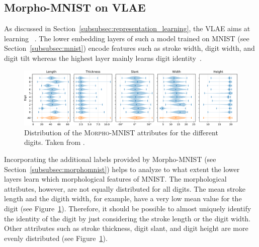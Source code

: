 \subsection{Morpho-MNIST on VLAE}\label{subsec:morpho-mnist-on-vlae}

As discussed in Section~\ref{subsubsec:representation_learning}, the \acl{VLAE} aims at learning ~\citep{zhao2017learning}.
The lower embedding layers of such a model trained on MNIST (see Section~\ref{subsubsec:mnist}) encode features such as stroke width, digit width, and digit tilt whereas the highest layer mainly learns digit identity~\citep{zhao2017learning}.

\begin{figure}
    \centering
    \includegraphics[width=\textwidth]{images/morpho_mnist_distribution.png}
    \caption{Distribution of the \textsc{Morpho-MNIST} attributes for the different digits. Taken from \citep{castro2019morpho}.}
    \label{fig:morpho_mnist_distribution}
\end{figure}

Incorporating the additional labels provided by Morpho-\textsc{MNIST} (see Section~\ref{subsubsec:morphomnist}) helps to analyze to what extent the lower layers learn which morphological features of \textsc{MNIST}.
The morphological attributes, however, are not equally distributed for all digits.
The mean stroke length and the digith width, for example, have a very low mean value for the digit  (see Figure~\ref{fig:morpho_mnist_distribution}).
Therefore, it should be possible to almost uniquely identify the identity of the digit  by just considering the stroke length or the digit width.
Other attributes such as stroke thickness, digit slant, and digit height are more evenly distributed (see Figure~\ref{fig:morpho_mnist_distribution}).

